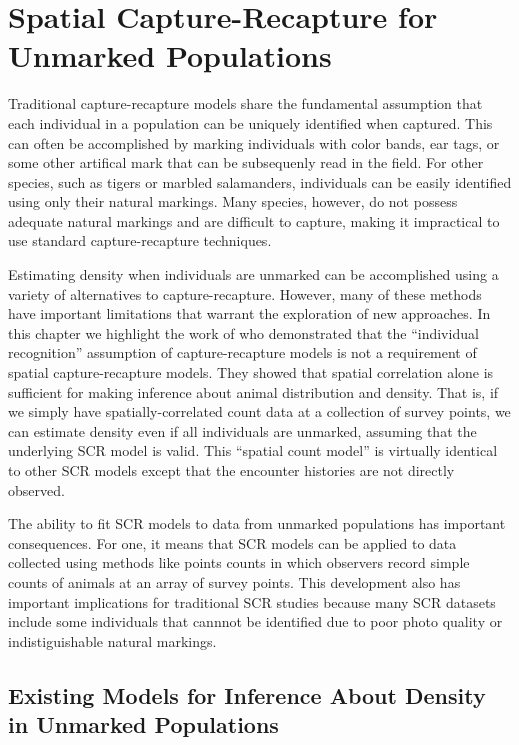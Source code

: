 


\chapter{Spatial Capture-Recapture for Unmarked Populations}
\label{chapt.scr-unmarked}

\vspace{0.3cm}


Traditional capture-recapture models share the fundamental
assumption that each individual in a population can be uniquely
identified when captured. This can often be accomplished
by marking individuals with color bands, ear tags, or some other
artifical mark that can be subsequenly read in the field. For other species, such as
tigers or marbled salamanders, individuals can be easily identified
using only their natural markings. Many species, however,
do not possess adequate natural markings and are
difficult to capture, making it impractical to use standard
capture-recapture techniques.

Estimating density when individuals are unmarked can be accomplished
using a variety of alternatives to capture-recapture. However, many of
these methods have important limitations that warrant the exploration
of new approaches.
In this chapter we highlight the work of \citet{chandler_royle:2012}
who demonstrated that the ``individual recognition'' assumption of
capture-recapture models is not a requirement of spatial capture-recapture
models. They showed that spatial correlation alone is sufficient for
making inference about animal distribution and density. That is, if
we simply have spatially-correlated
count data at a collection of survey points, we can estimate density
even if all individuals are unmarked, assuming that the underlying SCR
model is valid. This ``spatial count model'' is virtually identical to
other SCR models except that the encounter histories are not directly
observed.

The ability to fit
SCR models to data from unmarked populations has important
consequences. For one, it means that SCR models can
be applied to data collected using methods like points counts in which
observers record simple counts of animals at an array of survey
points. This development also has important implications for
traditional SCR studies because many SCR datasets include some
individuals that cannnot be identified due to poor photo quality or
indistiguishable natural markings.


\section{Existing Models for Inference About Density in Unmarked Populations}


